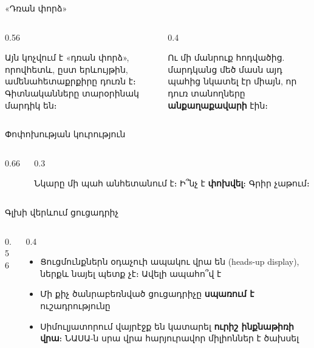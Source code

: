 \begin{frame}{«Դռան փորձ»}
  \begin{columns}[c]
    \begin{column}{0.56\textwidth}
      \begin{bookquote}
        Այն կոչվում է «դռան փորձ», որովհետև, ըստ երևույթին, ամենահետաքրքիրը դուռն է։ Գիտնականները տարօրինակ մարդիկ են։
      \end{bookquote}
    \end{column}
    \begin{column}{0.4\textwidth}
      \centering
      \par\medskip
      {\small Ու մի մանրուք հոդվածից. մարդկանց մեծ մասն այդ պահից նկատել էր միայն, որ դուռ տանողները \textbf{անքաղաքավարի} էին։}
    \end{column}
  \end{columns}
\end{frame}

\begin{frame}{Փոփոխության կուրություն}
  \begin{columns}[c]
    \begin{column}{0.66\textwidth}
      \centering
      
    \end{column}
    \begin{column}{0.3\textwidth}
      \begin{chatbox}
        Նկարը մի պահ անհետանում է։ Ի՞նչ է \textbf{փոխվել}։ Գրիր չաթում։
      \end{chatbox}
      \vspace{1mm}
    \end{column}
  \end{columns}
\end{frame}

\begin{frame}{Գլխի վերևում ցուցադրիչ}
  \begin{columns}[c]
    \begin{column}{0.56\textwidth}
      \centering
      
    \end{column}
    \begin{column}{0.4\textwidth}
      \begin{itemize}
        \item Ցուցմունքներն օդաչուի ապակու վրա են (heads-up display), ներքև նայել պետք չէ։ Ավելի ապահո՞վ է
        \item<2-> Մի քիչ ծանրաբեռնված ցուցադրիչը \textbf{սպառում է} ուշադրությունը
        \item<3-> Սիմուլյատորում վայրէջք են կատարել \textbf{ուրիշ ինքնաթիռի վրա}։ ՆԱՍԱ-ն սրա վրա հարյուրավոր միլիոններ է ծախսել
      \end{itemize}
    \end{column}
  \end{columns}
\end{frame}

